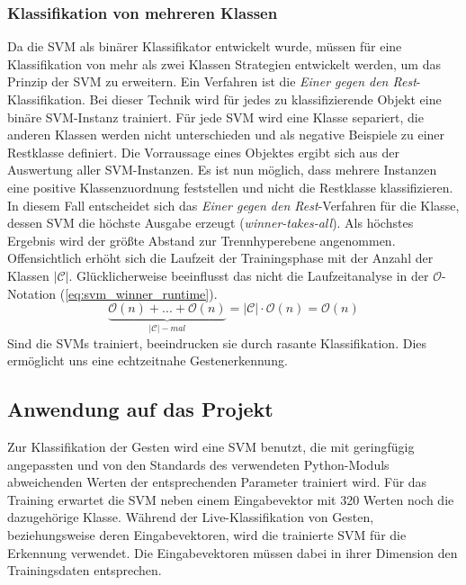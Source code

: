 \subsubsection{Klassifikation von mehreren Klassen}
Da die \ac{SVM} als binärer Klassifikator entwickelt wurde, müssen für eine Klassifikation von mehr als zwei Klassen Strategien entwickelt werden, um das Prinzip der \ac{SVM} zu erweitern. 
Ein Verfahren ist die \textit{Einer gegen den Rest}-Klassifikation. 
Bei dieser Technik wird für jedes zu klassifizierende Objekt eine binäre \ac{SVM}-Instanz trainiert. 
Für jede \ac{SVM} wird eine Klasse separiert, die anderen Klassen werden nicht unterschieden und als negative Beispiele zu einer Restklasse definiert. 
Die Vorraussage eines Objektes ergibt sich aus der Auswertung aller \ac{SVM}-Instanzen. 
Es ist nun möglich, dass mehrere Instanzen eine positive Klassenzuordnung feststellen und nicht die Restklasse klassifizieren. 
In diesem Fall entscheidet sich das \textit{Einer gegen den Rest}-Verfahren für die Klasse, dessen \ac{SVM} die höchste Ausgabe erzeugt (\textit{winner-takes-all}). 
Als höchstes Ergebnis wird der größte Abstand zur Trennhyperebene angenommen. 
Offensichtlich erhöht sich die Laufzeit der Trainingsphase mit der Anzahl der Klassen $|\mathcal{C}|$. 
Glücklicherweise beeinflusst das nicht die Laufzeitanalyse in der $\mathcal{O}$-Notation (\ref{eq:svm_winner_runtime}). 
\begin{equation}
\label{eq:svm_winner_runtime}
    \underbrace{\mathcal{O}(n) + ... + \mathcal{O}(n)}_{|\mathcal{C}|-mal} = |\mathcal{C}| \cdot \mathcal{O}(n) = \mathcal{O}(n)
\end{equation}
Sind die SVMs trainiert, beeindrucken sie durch rasante Klassifikation. 
Dies ermöglicht uns eine echtzeitnahe Gestenerkennung.


\subsection{Anwendung auf das Projekt}
Zur Klassifikation der Gesten wird eine \ac{SVM} benutzt, die mit geringfügig angepassten und von den Standards des verwendeten Python-Moduls abweichenden Werten der entsprechenden Parameter trainiert wird. 
Für das Training erwartet die \ac{SVM} neben einem Eingabevektor mit 320 Werten noch die dazugehörige Klasse.
Während der Live-Klassifikation von Gesten, beziehungsweise deren Eingabevektoren, wird die trainierte \ac{SVM} für die Erkennung verwendet.
Die Eingabevektoren müssen dabei in ihrer Dimension den Trainingsdaten entsprechen.

